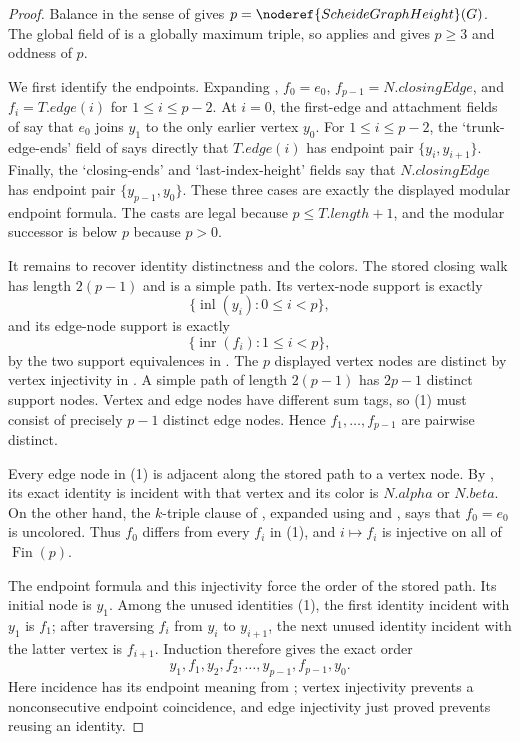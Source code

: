 \begin{proof}
Balance in the sense of  gives
$p=\noderef{ScheideGraphHeight}(G)$.  The global field of
 is a globally maximum triple, so
 applies and gives $p\geq3$ and oddness of
$p$.

We first identify the endpoints.  Expanding
, $f_0=e_0$, $f_{p-1}=N.closingEdge$, and
$f_i=T.edge(i)$ for $1\leq i\leq p-2$.  At $i=0$, the first-edge and
attachment fields of  say that $e_0$ joins $y_1$
to the only earlier vertex $y_0$.  For $1\leq i\leq p-2$, the
`trunk-edge-ends' field of  says
directly that $T.edge(i)$ has endpoint pair $\{y_i,y_{i+1}\}$.  Finally,
the `closing-ends' and `last-index-height' fields say that
$N.closingEdge$ has endpoint pair $\{y_{p-1},y_0\}$.  These three cases
are exactly the displayed modular endpoint formula.  The casts are legal
because $p\leq T.length+1$, and the modular successor is below $p$ because
$p>0$.

It remains to recover identity distinctness and the colors.  The stored
closing walk has length $2(p-1)$ and is a simple path.  Its vertex-node
support is exactly
\[
 \{\operatorname{inl}(y_i):0\leq i<p\},
\]
and its edge-node support is exactly
\[
 \{\operatorname{inr}(f_i):1\leq i<p\},                 \tag{1}
\]
by the two support equivalences in
.  The $p$ displayed vertex nodes are
distinct by vertex injectivity in .  A simple path
of length $2(p-1)$ has $2p-1$ distinct support nodes.  Vertex and edge
nodes have different sum tags, so (1) must consist of precisely $p-1$
distinct edge nodes.  Hence $f_1,\ldots,f_{p-1}$ are pairwise distinct.

Every edge node in (1) is adjacent along the stored path to a vertex node.
By , its exact identity is incident with
that vertex and its color is $N.alpha$ or $N.beta$.  On the other hand,
the $k$-triple clause of , expanded using
 and , says that
$f_0=e_0$ is uncolored.  Thus $f_0$ differs from every $f_i$ in (1), and
$i\mapsto f_i$ is injective on all of $\operatorname{Fin}(p)$.

The endpoint formula and this injectivity force the order of the stored
path.  Its initial node is $y_1$.  Among the unused identities (1), the
first identity incident with $y_1$ is $f_1$; after traversing $f_i$ from
$y_i$ to $y_{i+1}$, the next unused identity incident with the latter
vertex is $f_{i+1}$.  Induction therefore gives the exact order
\[
 y_1,f_1,y_2,f_2,\ldots,y_{p-1},f_{p-1},y_0.            \tag{2}
\]
Here incidence has its endpoint meaning from ; vertex
injectivity prevents a nonconsecutive endpoint coincidence, and edge
injectivity just proved prevents reusing an identity.


\end{proof}
